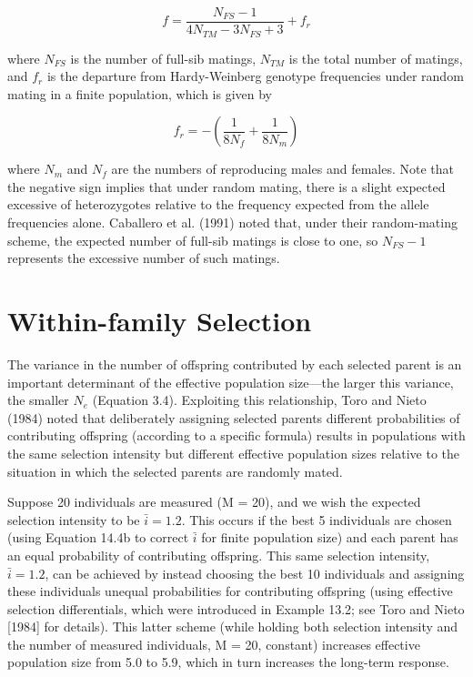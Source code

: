 \documentclass{article}
\begin{document}
{\begin{equation}
f=\frac{N_{FS}-1}{4N_{TM}-3N_{FS}+3}+f_{r}
\tag{26.26a}
\label{eq:26_26a}
\end{equation}

where  $ N_{FS} $ is the number of full-sib matings,  $ N_{TM} $ is the total number of matings, and  $ f_{r} $ is the departure from Hardy-Weinberg genotype frequencies under random mating in a finite population, which is given by

\begin{equation}
f_{r}=-\left(\frac{1}{8N_{f}}+\frac{1}{8N_{m}}\right)
\tag{26.26b}
\label{eq:26_26b}
\end{equation}

where  $ N_{m} $ and  $ N_{f} $ are the numbers of reproducing males and females. Note that the negative sign implies that under random mating, there is a slight expected excessive of heterozygotes relative to the frequency expected from the allele frequencies alone. Caballero et al. (1991) noted that, under their random-mating scheme, the expected number of full-sib matings is close to one, so  $ N_{FS} - 1 $ represents the excessive number of such matings.

\section{Within-family Selection}
The variance in the number of offspring contributed by each selected parent is an important determinant of the effective population size—the larger this variance, the smaller  $ N_{e} $ (Equation 3.4). Exploiting this relationship, Toro and Nieto (1984) noted that deliberately assigning selected parents different probabilities of contributing offspring (according to a specific formula) results in populations with the same selection intensity but different effective population sizes relative to the situation in which the selected parents are randomly mated.

Suppose 20 individuals are measured (M = 20), and we wish the expected selection intensity to be  $ \bar{i} = 1.2 $. This occurs if the best 5 individuals are chosen (using Equation 14.4b to correct  $ \bar{i} $ for finite population size) and each parent has an equal probability of contributing offspring. This same selection intensity,  $ \bar{i} = 1.2 $, can be achieved by instead choosing the best 10 individuals and assigning these individuals unequal probabilities for contributing offspring (using effective selection differentials, which were introduced in Example 13.2; see Toro and Nieto [1984] for details). This latter scheme (while holding both selection intensity and the number of measured individuals, M = 20, constant) increases effective population size from 5.0 to 5.9, which in turn increases the long-term response.

}
\end{document}
